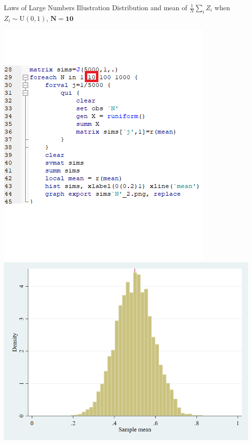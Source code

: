 \documentclass[11pt,english,handout]{beamer}
\begin{document}
\begin{frame}{Laws of Large Numbers Illustration}
	\vspace{0.2cm}
	Distribution and mean of $\frac{1}{N}\sum_i Z_i$ when $Z_i\sim \mathrm{U}(0,1)$, $\mathbf{N=10}$
	
	\begin{center}
		\includegraphics[scale=0.4]{Stata6.png} \includegraphics[scale=0.25]{sims10_2.png}
	\end{center}
	
\end{frame}
\end{document}
